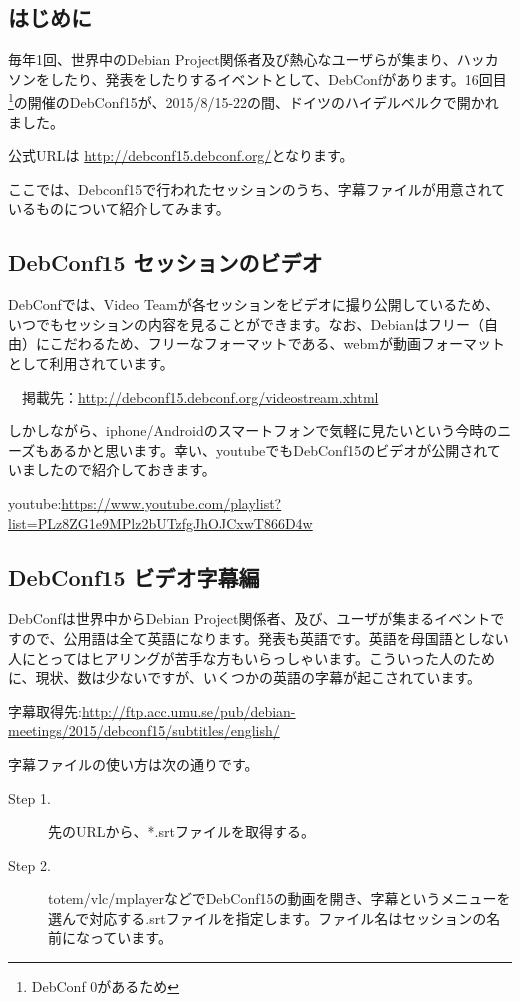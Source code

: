 \documentclass[mingoth,a4paper]{jsarticle}
\begin{document}
\subsection{はじめに}

 毎年1回、世界中のDebian Project関係者及び熱心なユーザらが集まり、ハッカソンをしたり、発表をしたりするイベントとして、DebConfがあります。16回目\footnote{DebConf 0があるため}の開催のDebConf15が、2015/8/15-22の間、ドイツのハイデルベルクで開かれました。

 公式URLは \url{http://debconf15.debconf.org/}となります。

 ここでは、Debconf15で行われたセッションのうち、字幕ファイルが用意されているものについて紹介してみます。

\subsection{DebConf15 セッションのビデオ}

 DebConfでは、Video Teamが各セッションをビデオに撮り公開しているため、いつでもセッションの内容を見ることができます。なお、Debianはフリー（自由）にこだわるため、フリーなフォーマットである、webmが動画フォーマットとして利用されています。

　掲載先：\url{http://debconf15.debconf.org/videostream.xhtml}

 しかしながら、iphone/Androidのスマートフォンで気軽に見たいという今時のニーズもあるかと思います。幸い、youtubeでもDebConf15のビデオが公開されていましたので紹介しておきます。

 youtube:\url{https://www.youtube.com/playlist?list=PLz8ZG1e9MPlz2bUTzfgJhOJCxwT866D4w}
  
\subsection{DebConf15 ビデオ字幕編}

 DebConfは世界中からDebian Project関係者、及び、ユーザが集まるイベントですので、公用語は全て英語になります。発表も英語です。英語を母国語としない人にとってはヒアリングが苦手な方もいらっしゃいます。こういった人のために、現状、数は少ないですが、いくつかの英語の字幕が起こされています。

 字幕取得先:\url{http://ftp.acc.umu.se/pub/debian-meetings/2015/debconf15/subtitles/english/}

 字幕ファイルの使い方は次の通りです。
 
  \begin{description}
\item [Step 1.] 先のURLから、*.srtファイルを取得する。
\item [Step 2.] totem/vlc/mplayerなどでDebConf15の動画を開き、字幕というメニューを選んで対応する.srtファイルを指定します。ファイル名はセッションの名前になっています。
  \end{description}    
  
\end{document}
